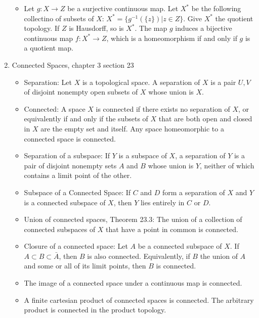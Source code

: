\documentclass[12pt,letterpaper]{article}
\begin{document}
\begin{enumerate}
\begin{itemize}
    \item \label{thm:HausdorffHomeomorphismQuotientMap} Let $g: X\rightarrow Z$ be a surjective continuous map. Let $X^*$ be the following collectino of subsets of $X$: $X^*=\{g^{-1}(\{z\}) | z\in Z\}$. Give $X^*$ the quotient topology. If $Z$ is Hausdorff, so is $X^*$. The map $g$ induces a bijective continuous map $f: X^*\rightarrow Z$, which is a homeomorphism if and only if $g$ is a quotient map.
  \end{itemize}
  \item \label{sec:connectedness} Connected Spaces, chapter 3 section 23
  \begin{itemize}
    \item \label{dfn:separation} Separation: Let $X$ is a topological space. A separation of $X$ is a pair $U,V$ of disjoint nonempty open subsets of $X$ whose union is $X$.
    \item \label{dfn:connected} Connected: A space $X$ is connected if there exists no separation of $X$, or equivalently if and only if the subsets of $X$ that are both open and closed in $X$ are the empty set and itself. Any space homeomorphic to a connected space is connected.
    \item \label{dfn:subspaceSeperation} Separation of a subspace: If $Y$ is a subspace of $X$, a separation of $Y$ is a pair of disjoint nonempty sets $A$ and $B$ whose union is $Y$, neither of which contains a limit point of the other.
    \item \label{thm:subspaceOfConnected} Subspace of a Connected Space: If $C$ and $D$ form a separation of $X$ and $Y$ is a connected subspace of $X$, then $Y$ lies entirely in $C$ or $D$.
    \item \label{thm:unionConnected} Union of connected spaces, Theorem 23.3: The union of a collection of connected subspaces of $X$ that have a point in common is connected.
    \item \label{thm:closureConnected} Closure of a connected space: Let $A$ be a connected subspace of $X$. If $A\subset B\subset \bar{A}$, then $B$ is also connected. Equivalently, if $B$ the union of $A$ and some or all of its limit points, then $B$ is connected.
    \item \label{thm:continuousConnected} The image of a connected space under a continuous map is connected.
    \item \label{thm:finiteCartesianConnected} A finite cartesian product of connected spaces is connected. The arbitrary product is connected in the product topology.
  \end{itemize}
\end{enumerate}
\end{document}
